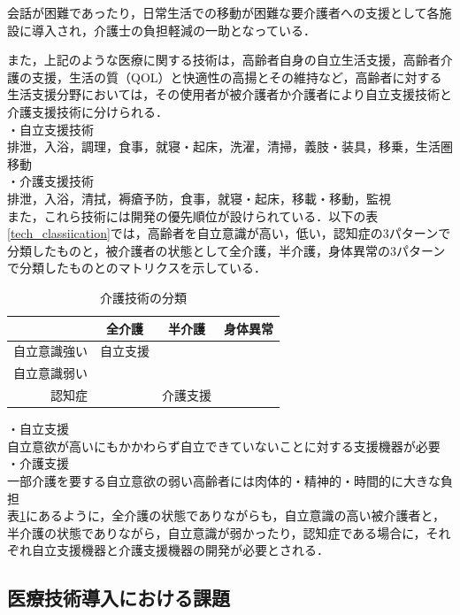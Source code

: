 会話が困難であったり，日常生活での移動が困難な要介護者への支援として各施設に導入され，介護士の負担軽減の一助となっている．

また，上記のような医療に関する技術は，高齢者自身の自立生活支援，高齢者介護の支援，生活の質（QOL）と快適性の高揚とその維持など，高齢者に対する生活支援分野においては，その使用者が被介護者か介護者により自立支援技術と介護支援技術に分けられる．\\
・自立支援技術 \\
排泄，入浴，調理，食事，就寝・起床，洗濯，清掃，義肢・装具，移乗，生活圏移動 \\
・介護支援技術 \\
排泄，入浴，清拭，褥瘡予防，食事，就寝・起床，移載・移動，監視 \\
また，これら技術には開発の優先順位が設けられている．以下の表\ref{tech_classiication}では，高齢者を自立意識が高い，低い，認知症の3パターンで分類したものと，被介護者の状態として全介護，半介護，身体異常の3パターンで分類したものとのマトリクスを示している．

\begin{table}[htb]
  \caption[介護技術の分類]{介護技術の分類}
  \label{tech_classification}
  \centering
  \begin{tabular}{r|c|c|c}
     & 全介護 & 半介護 & 身体異常 \\ \hline
    自立意識強い & 自立支援 & \quad & \quad \\
    自立意識弱い & \quad & \quad &  \quad \\
    認知症 & \quad & 介護支援 & \quad \\
    \end{tabular}
\end{table}

・自立支援 \\
自立意欲が高いにもかかわらず自立できていないことに対する支援機器が必要 \\
・介護支援 \\
一部介護を要する自立意欲の弱い高齢者には肉体的・精神的・時間的に大きな負担 \\
表\ref{tech_classification}にあるように，全介護の状態でありながらも，自立意識の高い被介護者と，半介護の状態でありながら，自立意識が弱かったり，認知症である場合に，それぞれ自立支援機器と介護支援機器の開発が必要とされる．

\subsection{医療技術導入における課題}

